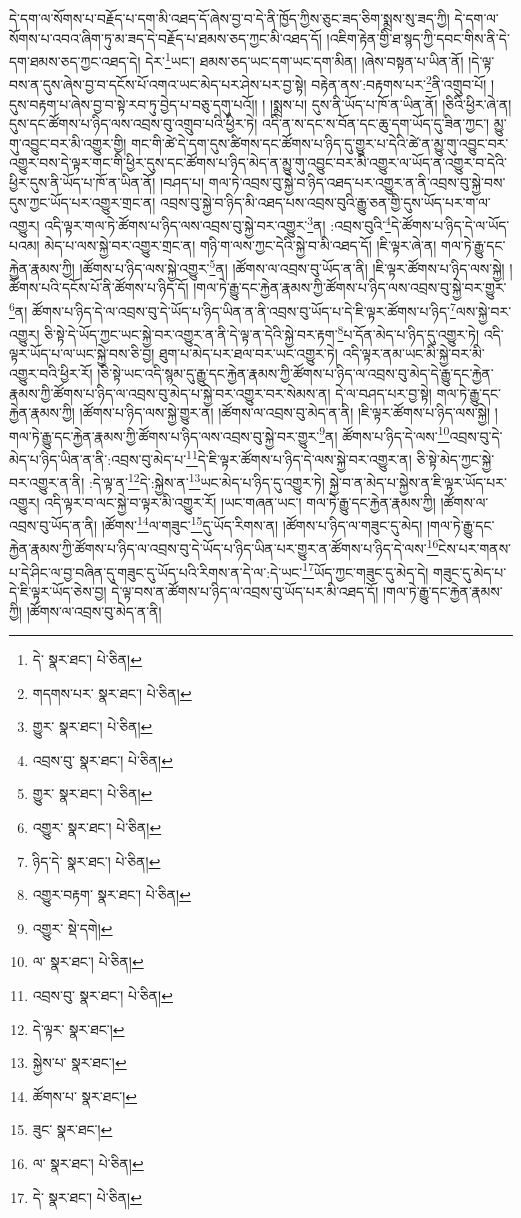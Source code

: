དེ་དག་ལ་སོགས་པ་བརྗོད་པ་དག་མི་འཐད་དོ་ཞེས་བྱ་བ་དེ་ནི་ཁྱོད་ཀྱིས་ཅུང་ཟད་ཅིག་སྨྲས་སུ་ཟད་ཀྱི། དེ་དག་ལ་སོགས་པ་འབའ་ཞིག་ཏུ་མ་ཟད་དེ་བརྗོད་པ་ཐམས་ཅད་ཀྱང་མི་འཐད་དོ། །འཇིག་རྟེན་གྱི་ཐ་སྙད་ཀྱི་དབང་གིས་ནི་དེ་དག་ཐམས་ཅད་ཀྱང་འཐད་དེ། དེར་\footnote{དེ་  སྣར་ཐང་།  པེ་ཅིན། }ཡང་། ཐམས་ཅད་ཡང་དག་ཡང་དག་མིན། །ཞེས་བསྟན་པ་ཡིན་ནོ། །དེ་ལྟ་བས་ན་དུས་ཞེས་བྱ་བ་དངོས་པོ་འགའ་ཡང་མེད་པར་ཤེས་པར་བྱ་སྟེ། བརྟེན་ནས་:བརྟགས་པར་\footnote{གདགས་པར་  སྣར་ཐང་།  པེ་ཅིན། }ནི་འགྲུབ་པོ། །དུས་བརྟག་པ་ཞེས་བྱ་བ་སྟེ་རབ་ཏུ་བྱེད་པ་བཅུ་དགུ་པའོ།། །
།སྨྲས་པ། དུས་ནི་ཡོད་པ་ཁོ་ན་ཡིན་ནོ། །ཅིའི་ཕྱིར་ཞེ་ན། དུས་དང་ཚོགས་པ་ཉིད་ལས་འབྲས་བུ་འགྲུབ་པའི་ཕྱིར་ཏེ། འདི་ན་ས་དང་ས་བོན་དང་ཆུ་དག་ཡོད་དུ་ཟིན་ཀྱང་། མྱུ་གུ་འབྱུང་བར་མི་འགྱུར་གྱི། གང་གི་ཚེ་དེ་དག་དུས་ཚིགས་དང་ཚོགས་པ་ཉིད་དུ་གྱུར་པ་དེའི་ཚེ་ན་མྱུ་གུ་འབྱུང་བར་འགྱུར་བས་དེ་ལྟར་གང་གི་ཕྱིར་དུས་དང་ཚོགས་པ་ཉིད་མེད་ན་མྱུ་གུ་འབྱུང་བར་མི་འགྱུར་ལ་ཡོད་ན་འགྱུར་བ་དེའི་ཕྱིར་དུས་ནི་ཡོད་པ་ཁོ་ན་ཡིན་ནོ། །བཤད་པ། གལ་ཏེ་འབྲས་བུ་སྐྱེ་བ་ཉིད་འཐད་པར་འགྱུར་ན་ནི་འབྲས་བུ་སྐྱེ་བས་དུས་ཀྱང་ཡོད་པར་འགྱུར་གྲང་ན། འབྲས་བུ་སྐྱེ་བ་ཉིད་མི་འཐད་པས་འབྲས་བུའི་རྒྱུ་ཅན་གྱི་དུས་ཡོད་པར་ག་ལ་འགྱུར། འདི་ལྟར་གལ་ཏེ་ཚོགས་པ་ཉིད་ལས་འབྲས་བུ་སྐྱེ་བར་འགྱུར་\footnote{གྱུར་  སྣར་ཐང་།  པེ་ཅིན། }ན། :འབྲས་བུའི་\footnote{འབྲས་བུ་  སྣར་ཐང་།  པེ་ཅིན། }དེ་ཚོགས་པ་ཉིད་དེ་ལ་ཡོད་པའམ། མེད་པ་ལས་སྐྱེ་བར་འགྱུར་གྲང་ན། གཉི་ག་ལས་ཀྱང་དེའི་སྐྱེ་བ་མི་འཐད་དོ། །ཇི་ལྟར་ཞེ་ན། གལ་ཏེ་རྒྱུ་དང་རྐྱེན་རྣམས་ཀྱི། །ཚོགས་པ་ཉིད་ལས་སྐྱེ་འགྱུར་\footnote{གྱུར་  སྣར་ཐང་།  པེ་ཅིན། }ན། །ཚོགས་ལ་འབྲས་བུ་ཡོད་ན་ནི། །ཇི་ལྟར་ཚོགས་པ་ཉིད་ལས་སྐྱེ། །ཚོགས་པའི་དངོས་པོ་ནི་ཚོགས་པ་ཉིད་དོ། །གལ་ཏེ་རྒྱུ་དང་རྐྱེན་རྣམས་ཀྱི་ཚོགས་པ་ཉིད་ལས་འབྲས་བུ་སྐྱེ་བར་གྱུར་\footnote{འགྱུར་  སྣར་ཐང་།  པེ་ཅིན། }ན། ཚོགས་པ་ཉིད་དེ་ལ་འབྲས་བུ་དེ་ཡོད་པ་ཉིད་ཡིན་ན་ནི་འབྲས་བུ་ཡོད་པ་དེ་ཇི་ལྟར་ཚོགས་པ་ཉིད་\footnote{ཉིད་དེ་  སྣར་ཐང་།  པེ་ཅིན། }ལས་སྐྱེ་བར་འགྱུར། ཅི་སྟེ་དེ་ཡོད་ཀྱང་ཡང་སྐྱེ་བར་འགྱུར་ན་ནི་དེ་ལྟ་ན་དེའི་སྐྱེ་བར་རྟག་\footnote{འགྱུར་བརྟག་  སྣར་ཐང་།  པེ་ཅིན། }པ་དོན་མེད་པ་ཉིད་དུ་འགྱུར་ཏེ། འདི་ལྟར་ཡོད་པ་ལ་ཡང་སྐྱེ་བས་ཅི་བྱ། ཐུག་པ་མེད་པར་ཐལ་བར་ཡང་འགྱུར་ཏེ། འདི་ལྟར་ནམ་ཡང་མི་སྐྱེ་བར་མི་འགྱུར་བའི་ཕྱིར་རོ། །ཅི་སྟེ་ཡང་འདི་སྙམ་དུ་རྒྱུ་དང་རྐྱེན་རྣམས་ཀྱི་ཚོགས་པ་ཉིད་ལ་འབྲས་བུ་མེད་དེ་རྒྱུ་དང་རྐྱེན་རྣམས་ཀྱི་ཚོགས་པ་ཉིད་ལ་འབྲས་བུ་མེད་པ་སྐྱེ་བར་འགྱུར་བར་སེམས་ན། དེ་ལ་བཤད་པར་བྱ་སྟེ། གལ་ཏེ་རྒྱུ་དང་རྐྱེན་རྣམས་ཀྱི། །ཚོགས་པ་ཉིད་ལས་སྐྱེ་གྱུར་ན། །ཚོགས་ལ་འབྲས་བུ་མེད་ན་ནི། །ཇི་ལྟར་ཚོགས་པ་ཉིད་ལས་སྐྱེ། །གལ་ཏེ་རྒྱུ་དང་རྐྱེན་རྣམས་ཀྱི་ཚོགས་པ་ཉིད་ལས་འབྲས་བུ་སྐྱེ་བར་གྱུར་\footnote{འགྱུར་  སྡེ་དགེ། }ན། ཚོགས་པ་ཉིད་དེ་ལས་\footnote{ལ་  སྣར་ཐང་།  པེ་ཅིན། }འབྲས་བུ་དེ་མེད་པ་ཉིད་ཡིན་ན་ནི་:འབྲས་བུ་མེད་པ་\footnote{འབྲས་བུ་  སྣར་ཐང་།  པེ་ཅིན། }དེ་ཇི་ལྟར་ཚོགས་པ་ཉིད་དེ་ལས་སྐྱེ་བར་འགྱུར་ན། ཅི་སྟེ་མེད་ཀྱང་སྐྱེ་བར་འགྱུར་ན་ནི། :དེ་ལྟ་ན་\footnote{དེ་ལྟར་  སྣར་ཐང་། }དེ་:སྐྱེས་ན་\footnote{སྐྱེས་པ་  སྣར་ཐང་། }ཡང་མེད་པ་ཉིད་དུ་འགྱུར་ཏེ། སྐྱེ་བ་ན་མེད་པ་སྐྱེས་ན་ཇི་ལྟར་ཡོད་པར་འགྱུར། འདི་ལྟར་བ་ལང་སྐྱེ་བ་ལྟར་མི་འགྱུར་རོ། །ཡང་གཞན་ཡང་། གལ་ཏེ་རྒྱུ་དང་རྐྱེན་རྣམས་ཀྱི། །ཚོགས་ལ་འབྲས་བུ་ཡོད་ན་ནི། །ཚོགས་\footnote{ཚོགས་པ་  སྣར་ཐང་། }ལ་གཟུང་\footnote{ཟུང་  སྣར་ཐང་། }དུ་ཡོད་རིགས་ན། །ཚོགས་པ་ཉིད་ལ་གཟུང་དུ་མེད། །གལ་ཏེ་རྒྱུ་དང་རྐྱེན་རྣམས་ཀྱི་ཚོགས་པ་ཉིད་ལ་འབྲས་བུ་དེ་ཡོད་པ་ཉིད་ཡིན་པར་གྱུར་ན་ཚོགས་པ་ཉིད་དེ་ལས་\footnote{ལ་  སྣར་ཐང་།  པེ་ཅིན། }ངེས་པར་གནས་པ་དེ་ཤིང་ལ་བྱ་བཞིན་དུ་གཟུང་དུ་ཡོད་པའི་རིགས་ན་དེ་ལ་:དེ་ཡང་\footnote{དེ་  སྣར་ཐང་།  པེ་ཅིན། }ཡོད་ཀྱང་གཟུང་དུ་མེད་དེ། གཟུང་དུ་མེད་པ་དེ་ཇི་ལྟར་ཡོད་ཅེས་བྱ། དེ་ལྟ་བས་ན་ཚོགས་པ་ཉིད་ལ་འབྲས་བུ་ཡོད་པར་མི་འཐད་དོ། །གལ་ཏེ་རྒྱུ་དང་རྐྱེན་རྣམས་ཀྱི། །ཚོགས་ལ་འབྲས་བུ་མེད་ན་ནི། 